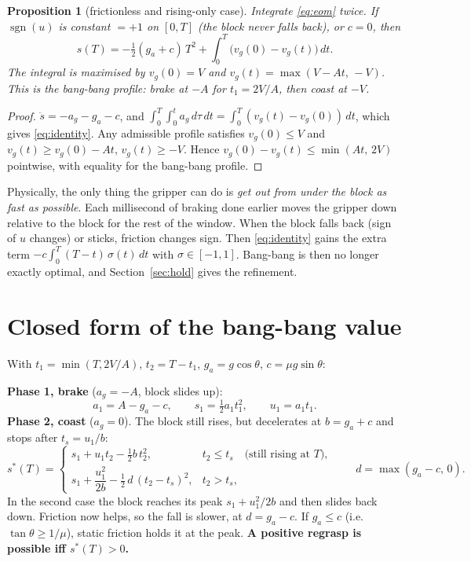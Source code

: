 \documentclass[11pt,a4paper]{article}
\newtheorem{proposition}{Proposition}
\newcommand{\sgn}{\operatorname{sgn}}
\begin{document}
\begin{proposition}[frictionless and rising-only case]\label{prop:bb}
Integrate \eqref{eq:eom} twice. If $\sgn(u)$ is constant $=+1$ on $[0,T]$ (the block never falls back), or $c=0$, then
\begin{equation}
  s(T) = -\tfrac12 (g_a + c)\,T^2 + \int_0^T \big(v_g(0)-v_g(t)\big)\,dt .
  \label{eq:identity}
\end{equation}
The integral is maximised by $v_g(0)=V$ and $v_g(t)=\max(V-At,\,-V)$. This is the \emph{bang-bang} profile:
brake at $-A$ for $t_1=2V/A$, then coast at $-V$.
\end{proposition}
\begin{proof}
$\ddot s = -a_g-g_a-c$, and $\int_0^T\!\int_0^t a_g\,d\tau\,dt=\int_0^T(v_g(t)-v_g(0))\,dt$, which gives
\eqref{eq:identity}. Any admissible profile satisfies $v_g(0)\le V$ and $v_g(t)\ge v_g(0)-At$, $v_g(t)\ge -V$.
Hence $v_g(0)-v_g(t)\le \min(At,\,2V)$ pointwise, with equality for the bang-bang profile.
\end{proof}
Physically, the only thing the gripper can do is \emph{get out from under the block as fast as possible}. Each
millisecond of braking done earlier moves the gripper down relative to the block for the rest of the window.
When the block falls back (sign of $u$ changes) or sticks, friction changes sign. Then \eqref{eq:identity} gains the
extra term $-c\int_0^T (T-t)\,\sigma(t)\,dt$ with $\sigma\in[-1,1]$. Bang-bang is then no longer exactly optimal, and
Section~\ref{sec:hold} gives the refinement.

\section{Closed form of the bang-bang value}\label{sec:closed}
With $t_1=\min(T,2V/A)$, $t_2=T-t_1$, $g_a=g\cos\theta$, $c=\mu g\sin\theta$:

\noindent\textbf{Phase 1, brake} ($a_g=-A$, block slides up):
\begin{equation}
  a_1 = A-g_a-c,\qquad s_1=\tfrac12 a_1 t_1^2,\qquad u_1=a_1t_1 .
\end{equation}
\textbf{Phase 2, coast} ($a_g=0$). The block still rises, but decelerates at $b=g_a+c$ and stops after $t_s=u_1/b$:
\begin{equation}
  s^*(T)=
  \begin{cases}
    s_1+u_1t_2-\tfrac12 b\,t_2^2, & t_2\le t_s \quad\text{(still rising at } T),\\[4pt]
    s_1+\dfrac{u_1^2}{2b}-\tfrac12\,d\,(t_2-t_s)^2, & t_2>t_s,
  \end{cases}
  \qquad d=\max(g_a-c,\,0).
  \label{eq:closed}
\end{equation}
In the second case the block reaches its peak $s_1+u_1^2/2b$ and then slides back down. Friction now helps, so the
fall is slower, at $d=g_a-c$. If $g_a\le c$ (i.e.\ $\tan\theta\ge1/\mu$), static friction holds it at the peak.
\textbf{A positive regrasp is possible iff $s^*(T)>0$.}
\end{document}
